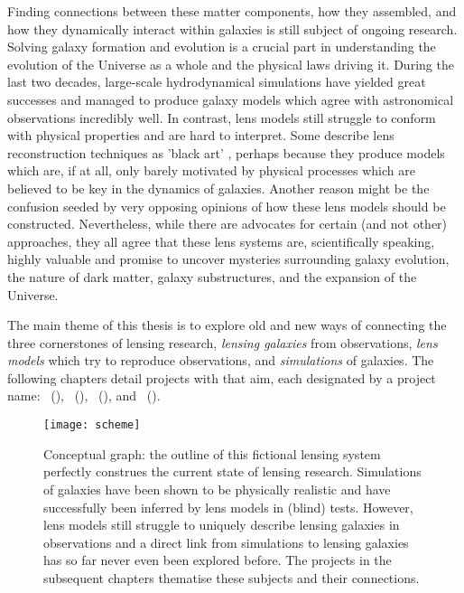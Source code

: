 Finding connections between these matter components, how they assembled, and how
they dynamically interact within galaxies is still subject of ongoing research.
Solving galaxy formation and evolution is a crucial part in understanding the
evolution of the Universe as a whole and the physical laws driving it.  During
the last two decades, large-scale hydrodynamical simulations have yielded great
successes and managed to produce galaxy models which agree with astronomical
observations incredibly well.  In contrast, lens models still struggle to
conform with physical properties and are hard to interpret.  Some describe lens
reconstruction techniques as 'black art' , perhaps because
they produce models which are, if at all, only barely motivated by physical
processes which are believed to be key in the dynamics of galaxies. Another
reason might be the confusion seeded by very opposing opinions
of how these lens models should be constructed.  Nevertheless, while there are
advocates for certain (and not other) approaches, they all agree that these lens
systems are, scientifically speaking, highly valuable and promise to uncover
mysteries surrounding galaxy evolution, the nature of dark matter, galaxy
substructures, and the expansion of the Universe.

The main theme of this thesis is to explore old and new ways of connecting the
three cornerstones of lensing research, \textit{lensing galaxies} from
observations, \textit{lens models} which try to reproduce observations, and
\textit{simulations} of galaxies.  The following chapters detail projects with
that aim, each designated by a project name: ~(),
~(), ~(), and
~().

%
\begin{figure}[h]%
    \centering%
    \texttt{[image: scheme]}%
    \caption[Conceptual graph]{Conceptual graph: the outline of this fictional
        lensing system perfectly construes the current state of lensing
        research.  Simulations of galaxies have been shown to be physically
        realistic and have successfully been inferred by lens models in (blind)
        tests.  However, lens models still struggle to uniquely describe lensing
        galaxies in observations and a direct link from simulations to lensing
        galaxies has so far never even been explored before.  The projects in
        the subsequent chapters thematise these subjects and their connections.
        }%
\end{figure}%
%

